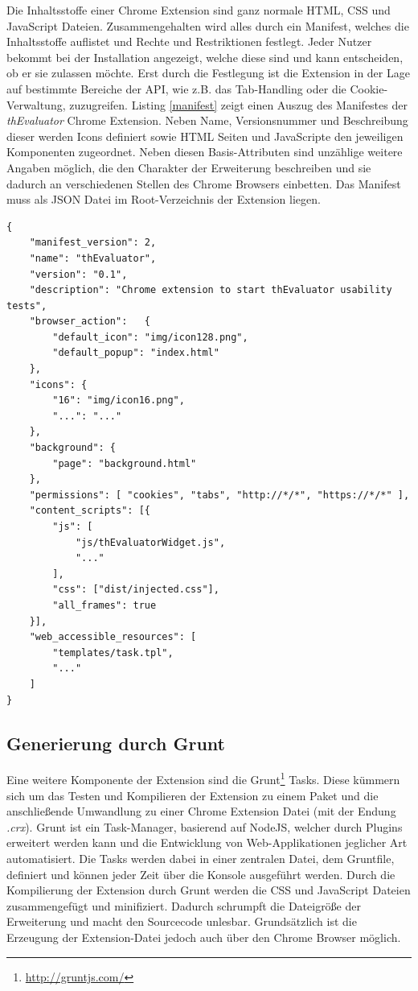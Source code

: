 Die Inhaltsstoffe einer Chrome Extension sind ganz normale HTML, CSS und JavaScript Dateien. Zusammengehalten wird alles durch ein Manifest, welches die Inhaltsstoffe auflistet und Rechte und Restriktionen festlegt. Jeder Nutzer bekommt bei der Installation angezeigt, welche diese sind und kann entscheiden, ob er sie zulassen möchte. Erst durch die Festlegung ist die Extension in der Lage auf bestimmte Bereiche der API, wie z.B. das Tab-Handling oder die Cookie-Verwaltung, zuzugreifen. Listing \ref{manifest} zeigt einen Auszug des Manifestes der \textit{thEvaluator} Chrome Extension. Neben Name, Versionsnummer und Beschreibung dieser werden Icons definiert sowie HTML Seiten und JavaScripte den jeweiligen Komponenten zugeordnet. Neben diesen Basis-Attributen sind unzählige weitere Angaben möglich, die den Charakter der Erweiterung beschreiben und sie dadurch an verschiedenen Stellen des Chrome Browsers einbetten. Das Manifest muss als JSON Datei im Root-Verzeichnis der Extension liegen.
\\
\begin{lstlisting}[caption=Auszug aus der Manifest.json der \textit{thEvaluator} Extension,label=manifest]
{
    "manifest_version": 2,
    "name": "thEvaluator",
    "version": "0.1",
    "description": "Chrome extension to start thEvaluator usability tests",
    "browser_action":   {
        "default_icon": "img/icon128.png",
        "default_popup": "index.html"
    },
    "icons": { 
        "16": "img/icon16.png",
        "...": "..."
    },
    "background": {
        "page": "background.html"
    },
    "permissions": [ "cookies", "tabs", "http://*/*", "https://*/*" ],
    "content_scripts": [{
        "js": [
            "js/thEvaluatorWidget.js",
            "..."
        ],
        "css": ["dist/injected.css"],
        "all_frames": true
    }],
    "web_accessible_resources": [
        "templates/task.tpl",
        "..."
    ]
}
\end{lstlisting}

\subsection{Generierung durch Grunt}

Eine weitere Komponente der Extension sind die Grunt\footnote{\url{http://gruntjs.com/}} Tasks. Diese kümmern sich um das Testen und Kompilieren der Extension zu einem Paket und die anschließende Umwandlung zu einer Chrome Extension Datei (mit der Endung \textit{.crx}). Grunt ist ein Task-Manager, basierend auf NodeJS, welcher durch Plugins erweitert werden kann und die Entwicklung von Web-Applikationen jeglicher Art automatisiert. Die Tasks werden dabei in einer zentralen Datei, dem Gruntfile, definiert und können jeder Zeit über die Konsole ausgeführt werden. Durch die Kompilierung der Extension durch Grunt werden die CSS und JavaScript Dateien zusammengefügt und minifiziert. Dadurch schrumpft die Dateigröße der Erweiterung und macht den Sourcecode unlesbar. Grundsätzlich ist die Erzeugung der Extension-Datei jedoch auch über den Chrome Browser möglich.

